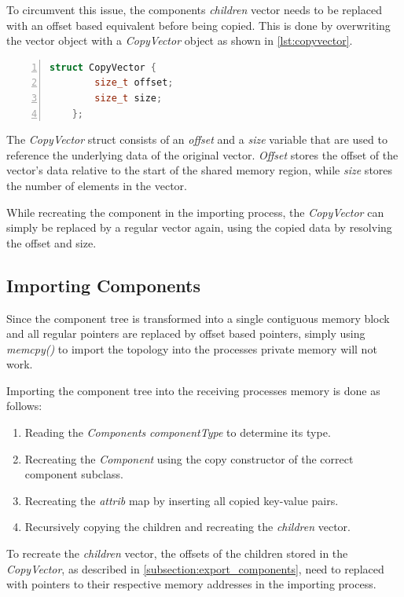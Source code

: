 To circumvent this issue, the components \emph{children} vector needs to be replaced with an offset based equivalent before being copied.
This is done by overwriting the vector object with a \emph{CopyVector} object as shown in \autoref{lst:copyvector}.

\begin{lstlisting}[language=c++, numbers=left, caption=Component Class, captionpos=b, label={lst:copyvector}]
    struct CopyVector {
        size_t offset;
        size_t size;
    };
\end{lstlisting}

The \emph{CopyVector} struct consists of an \emph{offset} and a \emph{size} variable that are used to reference the underlying data of the original vector.
\emph{Offset} stores the offset of the vector's data relative to the start of the shared memory region, while \emph{size} stores the number of elements in the vector.

While recreating the component in the importing process, the \emph{CopyVector} can simply be replaced by a regular vector again, using the copied data by resolving the offset and size.

\subsection{Importing Components}
Since the component tree is transformed into a single contiguous memory block and all regular pointers are replaced by offset based pointers, simply using \emph{memcpy()} to import the topology into the processes private memory will not work.

Importing the component tree into the receiving processes memory is done as follows:

\begin{enumerate}
    \item Reading the \emph{Components} \emph{componentType} to determine its type.
    \item Recreating the \emph{Component} using the copy constructor of the correct component subclass.
    \item Recreating the \emph{attrib} map by inserting all copied key-value pairs.
    \item Recursively copying the children and recreating the \emph{children} vector.
\end{enumerate}

To recreate the \emph{children} vector, the offsets of the children stored in the \emph{CopyVector}, as described in \autoref{subsection:export_components},
need to replaced with pointers to their respective memory addresses in the importing process.

